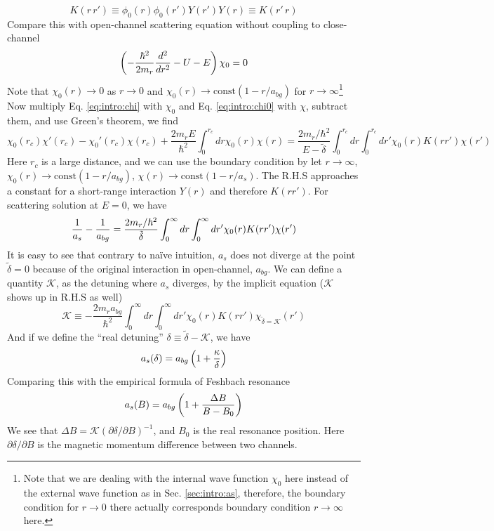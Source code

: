 \begin{equation}
K(r\,r')\equiv\phi_{0}(r)\phi_{0}(r')Y(r')Y(r)\equiv{}K(r'\,r)
\end{equation}
Compare this with open-channel scattering \sch equation without coupling to close-channel
\begin{equation}\label{eq:sec:chi0}
\left(-\frac{\hbar^{2}}{2m_{r}}\frac{d^{2}}{dr^{2}}-U-E\right)\chi_{0}=0
\end{equation}
Note that $\chi_{0}(r)\rightarrow0$ as $r\rightarrow0$ and $\chi_{0}(r)\rightarrow\text{const}(1-r/a_{bg})$ for $r\rightarrow\infty$\footnote{Note that we are dealing with the internal wave function $\chi_{0}$ here instead of the external wave function as in Sec. \ref{sec:intro:as}, therefore, the boundary condition for $r\rightarrow0$ there actually corresponds boundary condition $r\rightarrow\infty$ here.}  Now multiply Eq. \ref{eq:intro:chi} with $\chi_{0}$ and Eq. \ref{eq:intro:chi0} with $\chi$, subtract them, and use Green's theorem, we find 
\begin{equation}
\chi_{0}(r_{c})\chi'(r_{c})-\chi_{0}'(r_{c})\chi(r_{c})+\frac{2m_{r}E}{\hbar^{2}}\int_{0}^{r_{c}}dr\chi_{0}(r)\chi(r)
=\frac{2m_{r}/\hbar^{2}}{E-\tilde\delta}\int_{0}^{r_{c}}dr\int_{0}^{r_{c}}dr'\chi_{0}(r)K(rr')\chi(r')
\end{equation}
Here $r_{c}$ is a large distance, and we can use the boundary condition by let $r\rightarrow\infty$, $\chi_{0}(r)\rightarrow\text{const}(1-r/a_{bg})$, $\chi(r)\rightarrow\text{const}(1-r/a_{s})$.  The R.H.S approaches a constant for a short-range interaction $Y(r)$ and therefore $K(rr')$.  For scattering solution at  $E=0$, we have 
\begin{equation}
\frac{1}{a_{s}}-\frac{1}{a_{bg}}=\frac{2m_{r}/\hbar^{2}}{\tilde\delta}\int_{0}^{\infty}dr\int_{0}^{\infty}dr'\chi_{0}(r)K(rr')\chi(r')
\end{equation}
It is easy to see that contrary to na\"ive intuition, $a_{s}$ does not diverge at the point $\tilde\delta=0$ because of the original interaction in open-channel, $a_{bg}$.  We can define a quantity $\mathcal{K}$, as the detuning where $a_{s}$ diverges, by the implicit equation ($\mathcal{K}$ shows up in R.H.S as well)
\begin{equation}\label{eq:intro:kappa}
\mathcal{K}\equiv-\frac{2m_{r}a_{bg}}{\hbar^{2}}\int_{0}^{\infty}{dr}\int_{0}^{\infty}dr'\chi_{0}(r)K(rr')\chi_{\tilde\delta=\mathcal{K}}(r')
\end{equation}
And if we define the ``real detuning'' $\delta\equiv\tilde\delta-\mathcal{K}$, we have 
\begin{equation}
a_{s}(\delta)=a_{bg}\left(1+\frac{\kappa}{\delta}\right)
\end{equation}
Comparing this with the empirical formula of Feshbach resonance
\begin{equation}
a_{s}(B)=a_{bg}\left(1+\frac{\Delta{B}}{B-B_{0}}\right)
\end{equation}
We see that $\Delta{B}=\mathcal{K}(\partial\delta/\partial{B})^{-1}$, and $B_{0}$ is the real resonance position.  Here $\partial\delta/\partial{B}$ is the magnetic momentum difference between two channels.  


